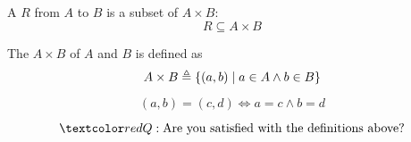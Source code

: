 
\begin{frame}{}
\end{frame}

% 

\begin{frame}{}
  \begin{columns}
  \end{columns}
\end{frame}

\begin{frame}{}
  \begin{columns}
      \pause
  \end{columns}
\end{frame}

\begin{frame}{}
  \begin{definition}[Relations]
    A  $R$ from $A$ to $B$ is a subset of $A \times B$:
    \[
      {R \subseteq A \times B}
    \]
  \end{definition}

  \pause
  \vspace{0.30cm}
  \begin{definition}
    The  $A \times B$ of $A$ and $B$ is defined as 
    \[
      {A \times B \triangleq \{(a, b) \mid a \in A \land b \in B\}}
    \]
  \end{definition}

  \pause
  \vspace{0.30cm}
  \begin{axiom}
    \[
      (a, b) = (c, d) \iff a = c \land b = d
    \]
  \end{axiom}

  \pause
  \[
    \red{Q: \text{Are you satisfied with the definitions above?}}
  \]
\end{frame}
